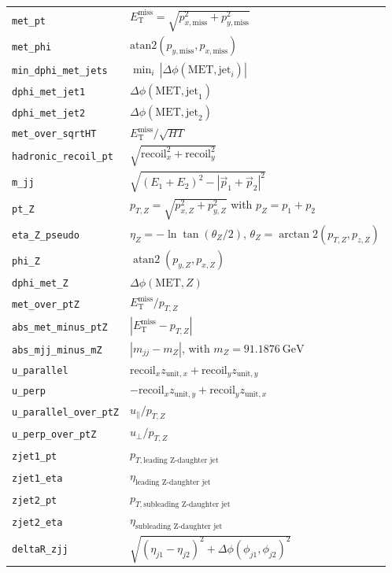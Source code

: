 \documentclass[11pt]{article}
\newcommand{\GeV}{\text{GeV}}
\newcommand{\MET}{\ensuremath{E_{\mathrm{T}}^{\mathrm{miss}}}}
\begin{document}
\begin{table}
\begin{tabular}{@{}>{\raggedright\arraybackslash}p{}>{\raggedright\arraybackslash}p{}@{}}
\texttt{met\_pt} & $\MET = \sqrt{p_{x,\text{miss}}^2 + p_{y,\text{miss}}^2}$ \\
\texttt{met\_phi} & $\mathrm{atan2}(p_{y,\text{miss}},p_{x,\text{miss}})$ \\
\texttt{min\_dphi\_met\_jets} & $\min_i\,|\Delta\phi(\mathrm{MET},\mathrm{jet}_i)|$ \\
\texttt{dphi\_met\_jet1} & $\Delta\phi(\mathrm{MET},\mathrm{jet}_1)$ \\
\texttt{dphi\_met\_jet2} & $\Delta\phi(\mathrm{MET},\mathrm{jet}_2)$ \\
\texttt{met\_over\_sqrtHT} & $\MET/\sqrt{HT}$ \\
\texttt{hadronic\_recoil\_pt} & $\sqrt{\text{recoil}_x^2 + \text{recoil}_y^2}$ \\
\texttt{m\_jj} & $\sqrt{(E_1+E_2)^2 - |\vec p_1 + \vec p_2|^2}$ \\
\texttt{pt\_Z} & $p_{T,Z}=\sqrt{p_{x,Z}^2+p_{y,Z}^2}$ with $p_Z=p_1+p_2$ \\
\texttt{eta\_Z\_pseudo} & $\eta_Z=-\ln\tan(\theta_Z/2)$, $\theta_Z=\arctan2(p_{T,Z},p_{z,Z})$ \\
\texttt{phi\_Z} & $\operatorname{atan2}(p_{y,Z},p_{x,Z})$ \\
\texttt{dphi\_met\_Z} & $\Delta\phi(\mathrm{MET},Z)$ \\
\texttt{met\_over\_ptZ} & $\MET/p_{T,Z}$ \\
\texttt{abs\_met\_minus\_ptZ} & $|\MET-p_{T,Z}|$ \\
\texttt{abs\_mjj\_minus\_mZ} & $|m_{jj}-m_Z|$, with $m_Z=91.1876~\GeV$ \\
\texttt{u\_parallel} & $\text{recoil}_x z_{\mathrm{unit},x}+\text{recoil}_y z_{\mathrm{unit},y}$ \\
\texttt{u\_perp} & $-\text{recoil}_x z_{\mathrm{unit},y}+\text{recoil}_y z_{\mathrm{unit},x}$ \\
\texttt{u\_parallel\_over\_ptZ} & $u_{\parallel}/p_{T,Z}$ \\
\texttt{u\_perp\_over\_ptZ} & $u_{\perp}/p_{T,Z}$ \\
\texttt{zjet1\_pt} & $p_{T,\text{leading Z-daughter jet}}$ \\
\texttt{zjet1\_eta} & $\eta_{\text{leading Z-daughter jet}}$ \\
\texttt{zjet2\_pt} & $p_{T,\text{subleading Z-daughter jet}}$ \\
\texttt{zjet2\_eta} & $\eta_{\text{subleading Z-daughter jet}}$ \\
\texttt{deltaR\_zjj} & $\sqrt{(\eta_{j1}-\eta_{j2})^2+\Delta\phi(\phi_{j1},\phi_{j2})^2}$ \\

\end{tabular}
\end{table}
\end{document}
